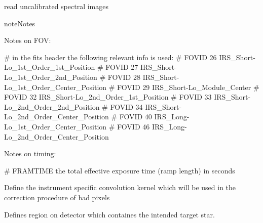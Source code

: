 \documentclass[a4paper,10pt,english]{sphinxmanual}
\begin{document}
\begin{fulllineitems}

\begin{fulllineitems}
\label{\detokenize{cascade.instruments:cascade.instruments.instruments.SpitzerIRS.get_spectral_images}}
read uncalibrated spectral images

\begin{sphinxadmonition}{note}{Notes}

Notes on FOV:

\# in the fits header the following relevant info is used:
\# FOVID     26     IRS\_Short-Lo\_1st\_Order\_1st\_Position
\# FOVID     27     IRS\_Short-Lo\_1st\_Order\_2nd\_Position
\# FOVID     28     IRS\_Short-Lo\_1st\_Order\_Center\_Position
\# FOVID     29     IRS\_Short-Lo\_Module\_Center
\# FOVID     32     IRS\_Short-Lo\_2nd\_Order\_1st\_Position
\# FOVID     33     IRS\_Short-Lo\_2nd\_Order\_2nd\_Position
\# FOVID     34     IRS\_Short-Lo\_2nd\_Order\_Center\_Position
\# FOVID     40     IRS\_Long-Lo\_1st\_Order\_Center\_Position
\# FOVID     46     IRS\_Long-Lo\_2nd\_Order\_Center\_Position

Notes on timing:

\# FRAMTIME the total effective exposure time (ramp length) in seconds
\end{sphinxadmonition}

\end{fulllineitems}


\begin{fulllineitems}
\label{\detokenize{cascade.instruments:cascade.instruments.instruments.SpitzerIRS._define_convolution_kernel}}
Define the instrument specific convolution kernel which will be used
in the correction procedure of bad pixels

\end{fulllineitems}


\begin{fulllineitems}
\label{\detokenize{cascade.instruments:cascade.instruments.instruments.SpitzerIRS._define_region_of_interest}}
Defines region on detector which containes the intended target star.


\end{fulllineitems}
\end{fulllineitems}
\end{document}
